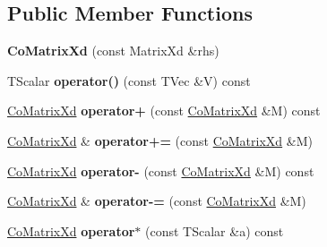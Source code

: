 \subsection*{Public Member Functions}
\begin{DoxyCompactItemize}
\item 
\hypertarget{struct_d_r_d_s_p_1_1_co_matrix_xd_a64a8d7fdf9f9016e32f92e5802546007}{{\bfseries Co\-Matrix\-Xd} (const Matrix\-Xd \&rhs)}\label{struct_d_r_d_s_p_1_1_co_matrix_xd_a64a8d7fdf9f9016e32f92e5802546007}

\item 
\hypertarget{struct_d_r_d_s_p_1_1_co_matrix_xd_a359bcb9f8dc228faf4a2ae571315cae2}{T\-Scalar {\bfseries operator()} (const T\-Vec \&V) const }\label{struct_d_r_d_s_p_1_1_co_matrix_xd_a359bcb9f8dc228faf4a2ae571315cae2}

\item 
\hypertarget{struct_d_r_d_s_p_1_1_co_matrix_xd_ab60da2584a81d0f8b9a6cc5765a0a9d9}{\hyperlink{struct_d_r_d_s_p_1_1_co_matrix_xd}{Co\-Matrix\-Xd} {\bfseries operator+} (const \hyperlink{struct_d_r_d_s_p_1_1_co_matrix_xd}{Co\-Matrix\-Xd} \&M) const }\label{struct_d_r_d_s_p_1_1_co_matrix_xd_ab60da2584a81d0f8b9a6cc5765a0a9d9}

\item 
\hypertarget{struct_d_r_d_s_p_1_1_co_matrix_xd_a147909d4f0f99ce675991efe2f4f9f6a}{\hyperlink{struct_d_r_d_s_p_1_1_co_matrix_xd}{Co\-Matrix\-Xd} \& {\bfseries operator+=} (const \hyperlink{struct_d_r_d_s_p_1_1_co_matrix_xd}{Co\-Matrix\-Xd} \&M)}\label{struct_d_r_d_s_p_1_1_co_matrix_xd_a147909d4f0f99ce675991efe2f4f9f6a}

\item 
\hypertarget{struct_d_r_d_s_p_1_1_co_matrix_xd_a35b2984f11ab3762caa6dd39f6645742}{\hyperlink{struct_d_r_d_s_p_1_1_co_matrix_xd}{Co\-Matrix\-Xd} {\bfseries operator-\/} (const \hyperlink{struct_d_r_d_s_p_1_1_co_matrix_xd}{Co\-Matrix\-Xd} \&M) const }\label{struct_d_r_d_s_p_1_1_co_matrix_xd_a35b2984f11ab3762caa6dd39f6645742}

\item 
\hypertarget{struct_d_r_d_s_p_1_1_co_matrix_xd_a86d7c369f687a0c0d3dbe00def6e44e7}{\hyperlink{struct_d_r_d_s_p_1_1_co_matrix_xd}{Co\-Matrix\-Xd} \& {\bfseries operator-\/=} (const \hyperlink{struct_d_r_d_s_p_1_1_co_matrix_xd}{Co\-Matrix\-Xd} \&M)}\label{struct_d_r_d_s_p_1_1_co_matrix_xd_a86d7c369f687a0c0d3dbe00def6e44e7}

\item 
\hypertarget{struct_d_r_d_s_p_1_1_co_matrix_xd_ada72f35802fe629ae2a1b7aca0420272}{\hyperlink{struct_d_r_d_s_p_1_1_co_matrix_xd}{Co\-Matrix\-Xd} {\bfseries operator$\ast$} (const T\-Scalar \&a) const }\label{struct_d_r_d_s_p_1_1_co_matrix_xd_ada72f35802fe629ae2a1b7aca0420272}


\end{DoxyCompactItemize}
